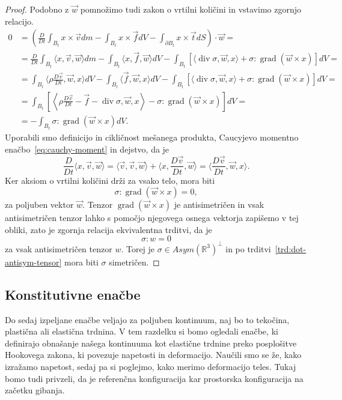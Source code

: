 \documentclass[12pt,a4paper,twoside]{article}
\theoremstyle{definition} %
\theoremstyle{plain} %
\numberwithin{equation}{section}
\newcommand{\R}{\mathbb R}
\renewcommand{\div}{\operatorname{div}}
\newcommand{\grad}{\operatorname{grad}}
\newcommand{\DD}[2]{\ensuremath{\frac{D #1}{D #2}}}
\newcommand{\DDt}[1]{\DD{#1}{t}}
\newcommand{\vv}{\vec{v}}
\newcommand{\vt}{\vec{t}}
\newcommand{\vw}{\vec{w}}
\newcommand{\vf}{\vec{f}}
\newcommand{\vx}{x}
\newcommand{\ts}{\sigma}
\begin{document}
\begin{proof}
Podobno z $\vw$ pomnožimo tudi zakon o vrtilni količini in vstavimo zgornjo
relacijo.
\begin{align*}
  0 &= \left(\DDt{}\int_{B_t}\vx \times \vv dm - \int_{B_t} \vx \times \vf dV -
  \int_{\partial B_t} \vx\times\vt dS\right)\cdot \vw = \\ &=
  \DDt{}\int_{B_t}\langle \vx, \vv, \vw\rangle  dm - \int_{B_t} \langle \vx,
  \vf, \vw\rangle dV - \int_{B_t} [\langle \div \ts, \vw, \vx\rangle +  \ts :
  \grad (\vw \times \vx)] dV = \\ &=
  \int_{B_t}\langle \rho \DDt\vv, \vw, \vx \rangle  dV - \int_{B_t} \langle \vf,
  \vw, \vx\rangle dV - \int_{B_t} [\langle \div \ts, \vw, \vx\rangle +  \ts :
  \grad (\vw \times \vx)] dV = \\ &=
\int_{B_t}\left[ \left\langle\rho \DDt\vv - \vf - \div \ts, \vw, \vx\right\rangle -  \ts : \grad
  (\vw \times \vx)\right] dV = \\ &=
- \int_{B_t} \ts : \grad (\vw \times \vx) dV.
\end{align*}
Uporabili smo definicijo in cikličnost mešanega produkta, Caucyjevo momentno
enačbo~\eqref{eq:cauchy-moment} in dejstvo, da je
\[
  \DDt{}\langle \vx, \vv, \vw \rangle =
  \langle \vv, \vv, \vw \rangle +
  \langle \vx, \DDt\vv, \vw \rangle =
  \langle \DDt\vv, \vw, \vx \rangle.
\]
Ker aksiom o vrtilni količini drži za vsako telo, mora biti
\[
  \ts : \grad (\vw \times \vx) = 0,
\]
za poljuben vektor $\vw$. Tenzor $\grad (\vw \times \vx)$ je antisimetričen in
vsak antisimetričen tenzor lahko s pomočjo njegovega osnega vektorja zapišemo v
tej obliki, zato je zgornja relacija ekvivalentna trditvi, da je
\[ \ts : w = 0\] za vsak antisimetričen tenzor $w$.
Torej je $\ts \in Asym(\R^3)^\perp$ in po trditvi~\ref{trd:dot-antisym-tensor}
mora biti $\ts$ simetričen.
\end{proof}

\subsection{Konstitutivne enačbe}
Do sedaj izpeljane enačbe veljajo za poljuben kontinuum, naj bo to tekočina,
plastična ali elastična trdnina. V tem razdelku si bomo ogledali enačbe, ki
definirajo obnašanje našega kontinuuma kot elastične trdnine preko posplošitve
Hookovega zakona, ki povezuje napetosti in deformacijo. Naučili smo se že, kako
izražamo napetost, sedaj pa si poglejmo, kako merimo deformacijo teles.
Tukaj bomo tudi privzeli, da je referenčna konfiguracija kar prostorska
konfiguracija na začetku gibanja.
\end{document}
